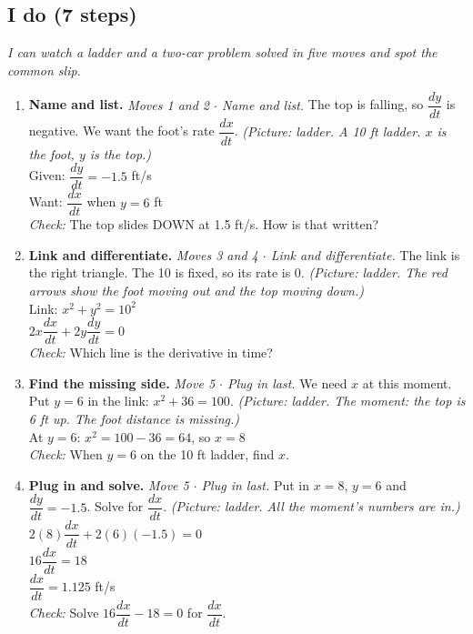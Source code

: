 \documentclass[11pt]{article}
\begin{document}
\subsection*{I do (7 steps)}
\textit{I can watch a ladder and a two-car problem solved in five moves and spot the common slip.}\par
\begin{enumerate}
\item \textbf{Name and list.} \textit{Moves 1 and 2 $\cdot$ Name and list.} The top is falling, so $\dfrac{dy}{dt}$ is negative. We want the foot's rate $\dfrac{dx}{dt}$. \textit{(Picture: ladder. A 10 ft ladder. $x$ is the foot, $y$ is the top.)}\\ Given: $\dfrac{dy}{dt}=-1.5$ ft/s\\ Want: $\dfrac{dx}{dt}$ when $y=6$ ft\\ \textit{Check:} The top slides DOWN at 1.5 ft/s. How is that written? 
\item \textbf{Link and differentiate.} \textit{Moves 3 and 4 $\cdot$ Link and differentiate.} The link is the right triangle. The 10 is fixed, so its rate is 0. \textit{(Picture: ladder. The red arrows show the foot moving out and the top moving down.)}\\ Link: $x^2+y^2=10^2$\\ $2x\dfrac{dx}{dt}+2y\dfrac{dy}{dt}=0$\\ \textit{Check:} Which line is the derivative in time? 
\item \textbf{Find the missing side.} \textit{Move 5 $\cdot$ Plug in last.} We need $x$ at this moment. Put $y=6$ in the link: $x^2+36=100$. \textit{(Picture: ladder. The moment: the top is 6 ft up. The foot distance is missing.)}\\ At $y=6$: $x^2=100-36=64$, so $x=8$\\ \textit{Check:} When $y=6$ on the 10 ft ladder, find $x$. 
\item \textbf{Plug in and solve.} \textit{Move 5 $\cdot$ Plug in last.} Put in $x=8$, $y=6$ and $\dfrac{dy}{dt}=-1.5$. Solve for $\dfrac{dx}{dt}$. \textit{(Picture: ladder. All the moment's numbers are in.)}\\ $2(8)\dfrac{dx}{dt}+2(6)(-1.5)=0$\\ $16\dfrac{dx}{dt}=18$\\ $\dfrac{dx}{dt}=1.125$ ft/s\\ \textit{Check:} Solve $16\dfrac{dx}{dt}-18=0$ for $\dfrac{dx}{dt}$. 

\end{enumerate}
\end{document}
